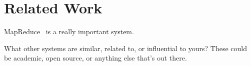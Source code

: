 \section{Related Work}

MapReduce~\cite{mapreduce} is a really important system.

What other systems are similar, related to, or influential to yours?  These
could be academic, open source, or anything else that's out there.
